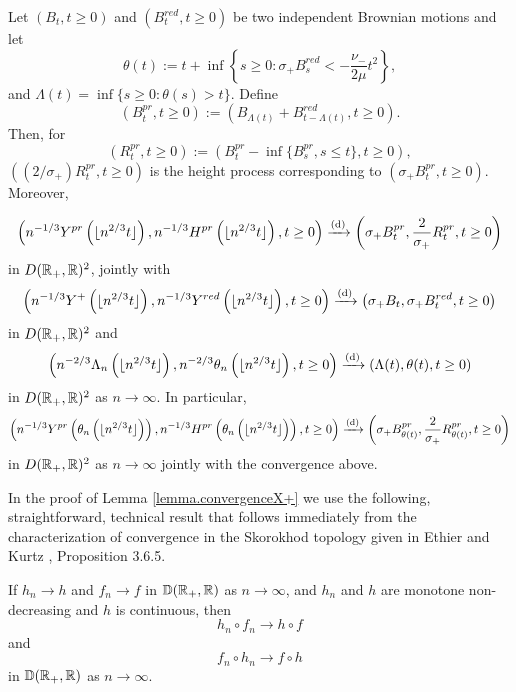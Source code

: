 \begin{lemma}\label{lemma.convergenceX+}
Let $(B_t, t \geq 0)$ and $(B^{red}_t, t\geq 0)$ be two independent Brownian motions and let $$\theta(t):=t+\inf\left\{s\geq 0 : \sigma_+ B^{red}_s< -\frac{\nu_-}{2\mu} t^2\right\},$$ and $\Lambda(t)=\inf\{s\geq 0:\theta(s)> t\}$. Define \begin{equation}\label{eq.definitionBpr}\left(B^{pr}_t,t \geq 0\right):=\left( B_{\Lambda(t)}+ B^{red}_{t-\Lambda(t)}, t\geq 0\right).\end{equation}
Then, for $$(R^{pr}_t, t\geq 0):=\left(B^{pr}_t-\inf\{B^{pr}_s,s\leq t\},t\geq 0\right),$$
$\left((2/\sigma_+)R^{pr}_t, t\geq 0\right)$
is the height process corresponding to $\left(\sigma_+ B^{pr}_t,t \geq 0\right)$.
Moreover,

\begin{equation}\label{eq.convergenceYpr} \left(n^{-1/3}Y^{pr}\left( \lfloor n^{2/3}t \rfloor \right), n^{-1/3}H^{pr}\left( \lfloor n^{2/3}t \rfloor \right),t\geq 0\right)\xrightarrow[]{\mathrm{(d)}}\left( \sigma_+ B^{pr}_{t} ,\frac{2}{\sigma_+}R^{pr}_t, t\geq 0\right)\end{equation}
in $D({\mathbb R}_+,{\mathbb R})^2$, jointly with 
$$\left(n^{-1/3}Y^+\left(\lfloor n^{2/3}t \rfloor \right), n^{-1/3}Y^{red}\left(\lfloor n^{2/3}t \rfloor \right), t\geq 0\right) \xrightarrow[]{\mathrm{(d)}}\left(\sigma_+ B_t,\sigma_+ B^{red}_t, t\geq 0\right)$$
in $D({\mathbb R}_+,{\mathbb R})^2$ and 
$$\left(n^{-2/3} \Lambda_n\left(\lfloor n^{2/3}t\rfloor \right), n^{-2/3}\theta_n\left(\lfloor n^{2/3}t\rfloor \right),t\geq 0\right)\xrightarrow[]{\mathrm{(d)}}\left(\Lambda(t),\theta(t), t\geq 0 \right)$$
in $D({\mathbb R}_+,{\mathbb R})^2$ as $n\to \infty$. 
In particular, 
\begin{equation}\label{eq.convergencecompSprandtheta}\left(n^{-1/3}Y^{pr}\left(\theta_n \left(\lfloor n^{2/3}t\rfloor \right)\right), n^{-1/3}H^{pr}\left(\theta_n\left(\lfloor n^{2/3}t\rfloor \right) \right),t\geq 0 \right) \xrightarrow[]{\mathrm{(d)}} \left(\sigma_+ B^{pr}_{\theta(t)}, \frac{2}{\sigma_+}R^{pr}_{\theta(t)},t\geq 0\right)\end{equation}
in $D({\mathbb R}_+,{\mathbb R})^2$ as $n\to \infty$ jointly with the convergence above.
\end{lemma}
In the proof of Lemma \ref{lemma.convergenceX+} we use the following, straightforward, technical result that follows immediately from the characterization of convergence in the Skorokhod topology given in Ethier and Kurtz \cite{ethierMarkovProcessesCharacterization1986}, Proposition 3.6.5.

\begin{lemma}\label{lemma.technicalcomposedfunctions}
If $h_n\to h$ and $f_n\to f$ in ${\mathbb D}({\mathbb R}_+,{\mathbb R})$ as $n\to\infty$, and $h_n$ and $h$ are monotone non-decreasing and $h$ is continuous, then 
$$h_n\circ f_n \to h\circ f$$
and 
$$f_n\circ h_n \to f\circ h$$
in ${\mathbb D}({\mathbb R}_+,{\mathbb R})$ as $n\to\infty$.
\end{lemma}



